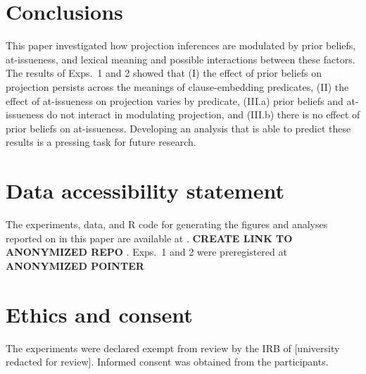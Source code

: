 \documentclass[11pt,fleqn]{article}
\newcommand{\6}{\mbox{$[\hspace*{-.6mm}[$}}
\newcommand{\9}{\mbox{$]\hspace*{-.6mm}]$}}
\begin{document}
\section{Conclusions}\label{s5}

This paper investigated how projection inferences are modulated by prior beliefs, at-issueness, and lexical meaning and possible interactions between these factors. The results of Exps.~1 and 2 showed that (I) the effect of prior beliefs on projection persists across the meanings of clause-embedding predicates, (II) the effect of at-issueness on projection varies by predicate, (III.a) prior beliefs and at-issueness do not interact in modulating projection, and (III.b) there is no effect of prior beliefs on at-issueness. Developing an analysis that is able to predict these results is a pressing task for future research.

\newpage

\section*{Data accessibility statement}

The experiments, data, and R code for generating the figures and analyses reported on in this paper are available at 
\url{}. {\bf CREATE LINK TO ANONYMIZED REPO}
.  Exps.~1 and 2 were preregistered at \url{} {\bf ANONYMIZED POINTER}

\section*{Ethics and consent}

The experiments were declared exempt from review by the IRB of [university redacted for review]. Informed consent was obtained from the participants.




%


\end{document}
